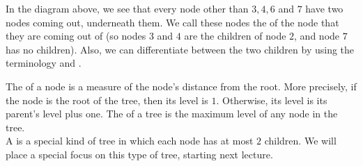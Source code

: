 In the diagram above, we see that every node other than $3, 4, 6$ and $7$ have two nodes coming out, underneath them. We call these nodes the  of the node that they are coming out of (so nodes $3$ and $4$ are the children of node $2$, and node $7$ has no children). Also, we can differentiate between the two children by using the terminology  and . 

The  of a node is a measure of the node's distance from the root. More precisely, if the node is the root of the tree, then its level is $1$. Otherwise, its level is its parent's level plus one. The  of a tree is the maximum level of any node in the tree. \\

A  is a special kind of tree in which each node has at most $2$ children. We will place a special focus on this type of tree, starting next lecture. 